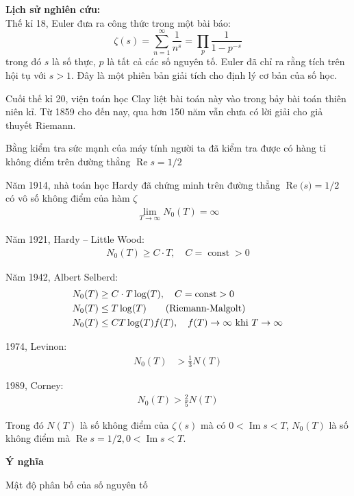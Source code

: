 \documentclass[14pt]{extarticle}
\newcommand{\real}[1]{\operatorname{Re}{#1}}
\newcommand{\imag}[1]{\operatorname{Im}{#1}}
\begin{document}
\textbf{Lịch sử nghiên cứu:}\\
Thế kỉ 18, Euler đưa ra công thức trong một bài báo:
\begin{equation*}
	\zeta(s)=\sum_{n=1}^\infty \frac{1}{n^s} = \prod_p \frac{1}{1-p^{-s}}
\end{equation*}
trong đó $s$ là số thực, $p$ là tất cả các số nguyên tố. Euler đã chỉ ra rằng tích trên hội tụ với $s >1$. Đây là một phiên bản giải tích cho định lý cơ bản của số học.\par
Cuối thế kỉ 20, viện toán học Clay liệt bài toán này vào trong bảy bài toán thiên niên kỉ. Từ 1859 cho đến nay, qua  hơn 150 năm vẫn chưa có lời giải cho giả thuyết Riemann.\par
Bằng kiểm tra sức mạnh của máy tính người ta đã kiểm tra được có hàng tỉ không điểm trên đường thẳng $\real{s} = 1/2$\par
Năm 1914, nhà toán học Hardy đã chứng minh trên đường thẳng $\real(s) = 1/2$ có vô số không điểm của hàm $\zeta$
\begin{align*}
	\lim_{T \to \infty}N_0(T) = \infty
\end{align*}\par
Năm 1921, Hardy -- Little Wood:
\begin{align*}
	\label{eq:}
	N_0(T)	\ge C\cdot T, \quad C = \operatorname{const} > 0 
\end{align*}\par
Năm 1942, Albert Selberd:
\begin{align*}
	N_0(T) &\ge C\cdot T\log(T), \quad C = \operatorname{const}>0\\
	N_0(T) &\le T\log(T) \tag{Riemann-Malgolt}\\
	N_0(T) &\le CT\log(T)f(T), \quad f(T) \to \infty \textnormal{ khi }T \to \infty
\end{align*}\par
1974, Levinon:
\begin{align*}
	N_0(T) &> \frac 1 3 N(T)
\end{align*}\par
1989, Corney:
\begin{align*}
	N_0(T) > \frac 2 5 N(T)
\end{align*}\par
Trong đó $N(T)$ là số không điểm của $\zeta(s)$ mà có $0 <\imag{s} < T$, $N_0(T)$ là số không điểm mà $\real{s} = 1/2, 0 < \imag{s} < T$.

\textbf{Ý nghĩa}\par
Mật độ phân bố của số nguyên tố
\end{document}
